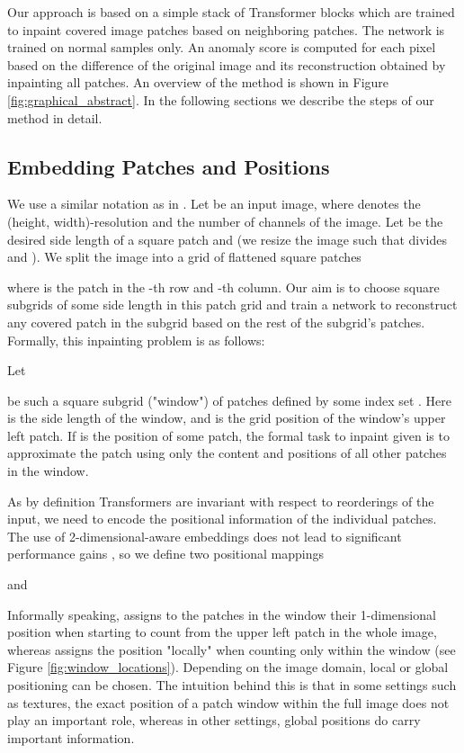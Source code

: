 \documentclass[final,5p,times,twocolumn]{elsarticle}
\begin{document}
	Our approach is based on a simple stack of Transformer blocks which are trained to inpaint covered image patches based on neighboring patches. The network is trained on normal samples only. An anomaly score is computed for each pixel based on the difference of the original image and its reconstruction obtained by inpainting all patches. An overview of the method is shown in Figure \ref{fig:graphical_abstract}. In the following sections we describe the steps of our method in detail.
	
	\subsection{Embedding Patches and Positions}
	\label{seq:embedding_patches}
	
	We use a similar notation as in \cite{dosovitskiy2020}. Let  be an input image, where  denotes the (height, width)-resolution and  the number of channels of the image. Let  be the desired side length of a square patch and  (we resize the image such that  divides  and ). We split the image  into a  grid of flattened square patches
	
	where  is the patch in the -th row and -th column. Our aim is to choose square subgrids of some side length  in this patch grid and train a network to reconstruct any covered patch in the subgrid based on the rest of the subgrid's patches. Formally, this inpainting problem is as follows:
	
	Let
	
	be such a square subgrid ("window") of patches defined by some index set . Here  is the side length of the window, and  is the grid position of the window's upper left patch. If  is the position of some patch, the formal task to inpaint  given  is to approximate the patch  using only the content and positions of all other patches  in the window.
	
	As by definition Transformers are invariant with respect to reorderings of the input, we need to encode the positional information of the individual patches. The use of 2-dimensional-aware embeddings does not lead to significant performance gains \cite{dosovitskiy2020}, so we define two positional mappings
	
	and
	
	
	Informally speaking,  assigns to the patches in the window their 1-dimensional position when starting to count from the upper left patch in the whole image, whereas  assigns the position "locally" when counting only within the window (see Figure \ref{fig:window_locations}). Depending on the image domain, local or global positioning can be chosen. The intuition behind this is that in some settings such as textures, the exact position of a patch window within the full image does not play an important role, whereas in other settings, global positions do carry important information.
	
\end{document}
